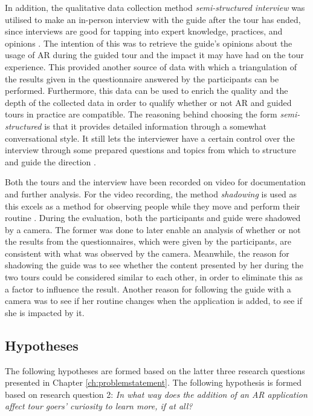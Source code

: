 In addition, the qualitative data collection method \textit{semi-structured interview} was utilised to make an in-person interview with the guide after the tour has ended, since interviews are good for tapping into expert knowledge, practices, and opinions \cite{RAND}. The intention of this was to retrieve the guide’s opinions about the usage of AR during the guided tour and the impact it may have had on the tour experience. This provided another source of data with which a triangulation of the results given in the questionnaire answered by the participants can be performed. Furthermore, this data can be used to enrich the quality and the depth of the collected data in order to qualify whether or not AR and guided tours in practice are compatible. The reasoning behind choosing the form \textit{semi-structured} is that it provides detailed information through a somewhat conversational style. It still lets the interviewer have a certain control over the interview through some prepared questions and topics from which to structure and guide the direction \cite{RAND}.

Both the tours and the interview have been recorded on video for documentation and further analysis. For the video recording, the method \textit{shadowing} is used as this excels as a method for observing people while they move and perform their routine \cite{Ylirisku2007}. During the evaluation, both the participants and guide were shadowed by a camera. The former was done to later enable an analysis of whether or not the results from the questionnaires, which were given by the participants, are consistent with what was observed by the camera. Meanwhile, the reason for shadowing the guide was to see whether the content presented by her during the two tours could be considered similar to each other, in order to eliminate this as a factor to influence the result. Another reason for following the guide with a camera was to see if her routine changes when the application is added, to see if she is impacted by it.

\subsection{Hypotheses}\label{sec:hypotheses}
The following hypotheses are formed based on the latter three research questions presented in Chapter \ref{ch:problemstatement}. The following hypothesis is formed based on research question 2: \textit{In what way does the addition of an AR application affect tour goers’ curiosity to learn more, if at all?}

